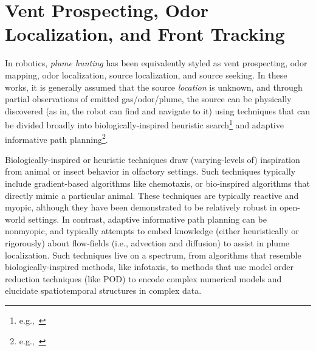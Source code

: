\section{Vent Prospecting, Odor Localization, and Front Tracking}
\label{sec:rw_planning}
In robotics, \emph{plume hunting} has been equivalently styled as vent prospecting, odor mapping, odor localization, source localization, and source seeking. In these works, it is generally assumed that the source \emph{location} is unknown, and through partial observations of emitted gas/odor/plume, the source can be physically discovered (as in, the robot can find and navigate to it) using techniques that can be divided broadly into biologically-inspired heuristic search\footnote{e.g.,~\cite{reddy2022olfactory,chen2019odor}} and adaptive informative path planning\footnote{e.g.,~\cite{salam2019adaptive, jakuba2007stochastic}}.

Biologically-inspired or heuristic techniques draw (varying-levels of) inspiration from animal or insect behavior in olfactory settings. Such techniques typically include gradient-based algorithms like chemotaxis\autocite{morse1998robust}, or bio-inspired algorithms that directly mimic a particular animal\autocite{edwards2001representing,grasso2000biomimetic}. These techniques are typically reactive and myopic, although they have been demonstrated to be relatively robust in open-world settings. In contrast, adaptive informative path planning can be nonmyopic, and typically attempts to embed knowledge (either heuristically or rigorously) about flow-fields (i.e., advection and diffusion) to assist in plume localization. Such techniques live on a spectrum, from algorithms that resemble biologically-inspired methods, like infotaxis\autocite{vergassola2007infotaxis}, to methods that use model order reduction techniques (like POD) to encode complex numerical models and elucidate spatiotemporal structures in complex data\autocite{peng2014dynamic,salam2019adaptive}. 

